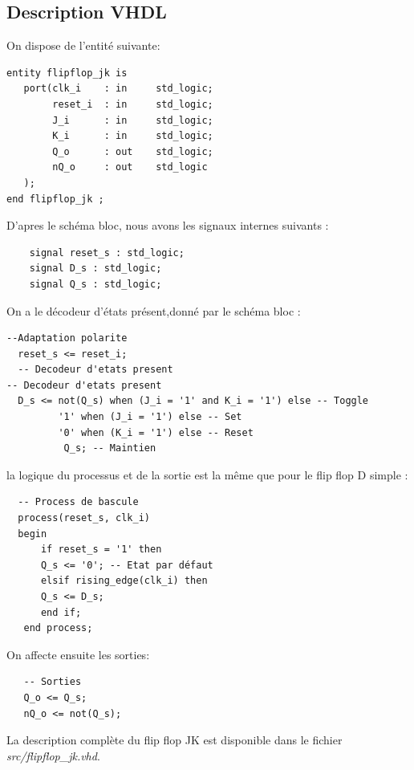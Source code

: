 \subsection{Description VHDL}
On dispose de l'entité suivante:
\begin{verbatim}
entity flipflop_jk is
   port(clk_i    : in     std_logic;
        reset_i  : in     std_logic;
        J_i      : in     std_logic;
        K_i      : in     std_logic;
        Q_o      : out    std_logic;
        nQ_o     : out    std_logic
   );
end flipflop_jk ;
\end{verbatim}
D'apres le schéma bloc, nous avons les signaux internes suivants :
\begin{verbatim}
    signal reset_s : std_logic;
    signal D_s : std_logic;
    signal Q_s : std_logic;
\end{verbatim}
On a le décodeur d'états présent,donné par le schéma bloc :
\begin{verbatim}
--Adaptation polarite
  reset_s <= reset_i;
  -- Decodeur d'etats present
-- Decodeur d'etats present
  D_s <= not(Q_s) when (J_i = '1' and K_i = '1') else -- Toggle
		 '1' when (J_i = '1') else -- Set
         '0' when (K_i = '1') else -- Reset
          Q_s; -- Maintien
\end{verbatim}
la logique du processus et de la sortie est la même que pour le flip flop D simple :
\begin{verbatim}
  -- Process de bascule
  process(reset_s, clk_i)
  begin
      if reset_s = '1' then
      Q_s <= '0'; -- Etat par défaut
      elsif rising_edge(clk_i) then
      Q_s <= D_s;
      end if;
   end process;
\end{verbatim}
On affecte ensuite les sorties:
\begin{verbatim}
   -- Sorties
   Q_o <= Q_s;
   nQ_o <= not(Q_s);
\end{verbatim}
La description complète du flip flop JK est disponible dans le fichier \textit{src/flipflop\_jk.vhd}.

